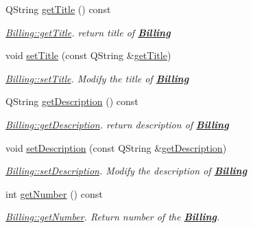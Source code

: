 \begin{DoxyCompactItemize}
\item 
Q\-String \hyperlink{classModels_1_1Billing_a15cd358ce3cab05668c62c0771afdb85}{get\-Title} () const 
\begin{DoxyCompactList}\small\item\em \hyperlink{classModels_1_1Billing_a15cd358ce3cab05668c62c0771afdb85}{Billing\-::get\-Title}. return title of {\bfseries \hyperlink{classModels_1_1Billing}{Billing}} \end{DoxyCompactList}\item 
void \hyperlink{classModels_1_1Billing_ae20cea169abdffa5daaa368547425928}{set\-Title} (const Q\-String \&\hyperlink{classModels_1_1Billing_a15cd358ce3cab05668c62c0771afdb85}{get\-Title})
\begin{DoxyCompactList}\small\item\em \hyperlink{classModels_1_1Billing_ae20cea169abdffa5daaa368547425928}{Billing\-::set\-Title}. Modify the title of {\bfseries \hyperlink{classModels_1_1Billing}{Billing}} \end{DoxyCompactList}\item 
Q\-String \hyperlink{classModels_1_1Billing_a5802215da8f4407457b8aeb7be525c65}{get\-Description} () const 
\begin{DoxyCompactList}\small\item\em \hyperlink{classModels_1_1Billing_a5802215da8f4407457b8aeb7be525c65}{Billing\-::get\-Description}. return description of {\bfseries \hyperlink{classModels_1_1Billing}{Billing}} \end{DoxyCompactList}\item 
void \hyperlink{classModels_1_1Billing_adb5cf4382150387f10bb6b774ace6bc8}{set\-Description} (const Q\-String \&\hyperlink{classModels_1_1Billing_a5802215da8f4407457b8aeb7be525c65}{get\-Description})
\begin{DoxyCompactList}\small\item\em \hyperlink{classModels_1_1Billing_adb5cf4382150387f10bb6b774ace6bc8}{Billing\-::set\-Description}. Modify the description of {\bfseries \hyperlink{classModels_1_1Billing}{Billing}} \end{DoxyCompactList}\item 
int \hyperlink{classModels_1_1Billing_a48c6e28a4aec13f8ed6b3ebbab837f0b}{get\-Number} () const 
\begin{DoxyCompactList}\small\item\em \hyperlink{classModels_1_1Billing_a48c6e28a4aec13f8ed6b3ebbab837f0b}{Billing\-::get\-Number}. Return number of the {\bfseries \hyperlink{classModels_1_1Billing}{Billing}}. \end{DoxyCompactList}\item 

\end{DoxyCompactItemize}
